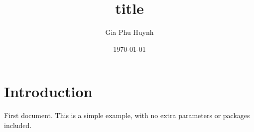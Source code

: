 \documentclass[11pt]{article}
\title{title}
\author{Gia Phu Huynh}
\date{\today}
\begin{document}
\maketitle
\pagebreak
\section{Introduction}
First document. This is a simple example, with no 
extra parameters or packages included.
\end{document}
